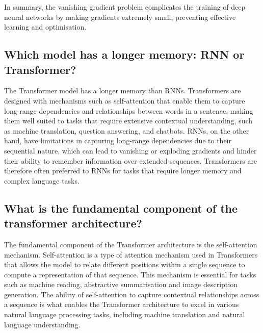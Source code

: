 \documentclass{article}
\begin{document}
In summary, the vanishing gradient problem complicates the training of deep neural networks by making gradients extremely small, preventing effective learning and optimisation.


\subsection{Which model has a longer memory: RNN or Transformer?}

The Transformer model has a longer memory than RNNs.
Transformers are designed with mechanisms such as self-attention that enable them to capture long-range dependencies and relationships between words in a sentence, making them well suited to tasks that require extensive contextual understanding, such as machine translation, question answering, and chatbots.
RNNs, on the other hand, have limitations in capturing long-range dependencies due to their sequential nature, which can lead to vanishing or exploding gradients and hinder their ability to remember information over extended sequences.
Transformers are therefore often preferred to RNNs for tasks that require longer memory and complex language tasks.


\subsection{What is the fundamental component of the transformer architecture?}

The fundamental component of the Transformer architecture is the self-attention mechanism.
Self-attention is a type of attention mechanism used in Transformers that allows the model to relate different positions within a single sequence to compute a representation of that sequence.
This mechanism is essential for tasks such as machine reading, abstractive summarisation and image description generation.
The ability of self-attention to capture contextual relationships across a sequence is what enables the Transformer architecture to excel in various natural language processing tasks, including machine translation and natural language understanding.

\newpage 
\end{document}
